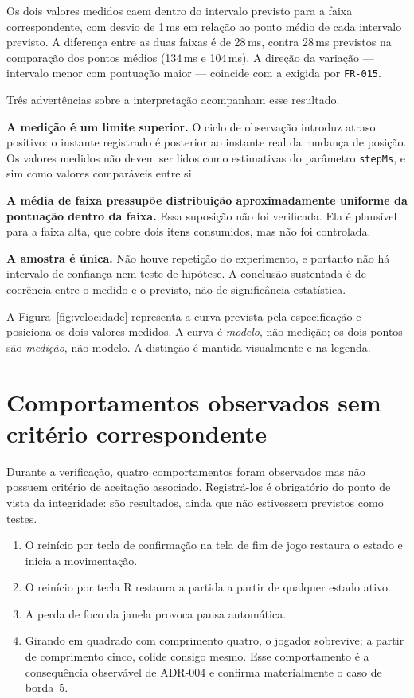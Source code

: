 Os dois valores medidos caem dentro do intervalo previsto para a faixa
correspondente, com desvio de 1\,ms em relação ao ponto médio de cada intervalo
previsto. A diferença entre as duas faixas é de 28\,ms, contra 28\,ms previstos
na comparação dos pontos médios (134\,ms e 104\,ms). A direção da variação ---
intervalo menor com pontuação maior --- coincide com a exigida por
\texttt{FR-015}.

Três advertências sobre a interpretação acompanham esse resultado.

\textbf{A medição é um limite superior.} O ciclo de observação introduz atraso
positivo: o instante registrado é posterior ao instante real da mudança de
posição. Os valores medidos não devem ser lidos como estimativas do parâmetro
\texttt{stepMs}, e sim como valores comparáveis entre si.

\textbf{A média de faixa pressupõe distribuição aproximadamente uniforme da
pontuação dentro da faixa.} Essa suposição não foi verificada. Ela é plausível
para a faixa alta, que cobre dois itens consumidos, mas não foi controlada.

\textbf{A amostra é única.} Não houve repetição do experimento, e portanto não há
intervalo de confiança nem teste de hipótese. A conclusão sustentada é de
coerência entre o medido e o previsto, não de significância estatística.

A Figura~\ref{fig:velocidade} representa a curva prevista pela especificação e
posiciona os dois valores medidos. A curva é \emph{modelo}, não medição; os dois
pontos são \emph{medição}, não modelo. A distinção é mantida visualmente e na
legenda.



\section{Comportamentos observados sem critério correspondente}
\label{sec:res-extras}

Durante a verificação, quatro comportamentos foram observados mas não possuem
critério de aceitação associado. Registrá-los é obrigatório do ponto de vista da
integridade: são resultados, ainda que não estivessem previstos como testes.

\begin{enumerate}
	\item O reinício por tecla de confirmação na tela de fim de jogo restaura o estado e inicia a movimentação.
	\item O reinício por tecla R restaura a partida a partir de qualquer estado ativo.
	\item A perda de foco da janela provoca pausa automática.
	\item Girando em quadrado com comprimento quatro, o jogador sobrevive; a partir de comprimento cinco, colide consigo mesmo. Esse comportamento é a consequência observável de ADR-004 e confirma materialmente o caso de borda~5.
\end{enumerate}


